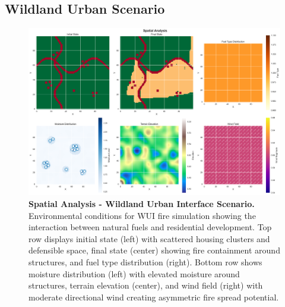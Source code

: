 \subsection{Wildland Urban Scenario}
\begin{figure}[H]
	\centering
	\includegraphics[width=\textwidth]{media/spatial_analysis_wui.png}
	\caption{
		\textbf{Spatial Analysis - Wildland Urban Interface Scenario.} 
		Environmental conditions for WUI fire simulation showing the interaction between natural fuels and residential development. Top row displays initial state (left) with scattered housing clusters and defensible space, final state (center) showing fire containment around structures, and fuel type distribution (right). Bottom row shows moisture distribution (left) with elevated moisture around structures, terrain elevation (center), and wind field (right) with moderate directional wind creating asymmetric fire spread potential.
	}
	\label{fig:spatial_wui}
\end{figure}


